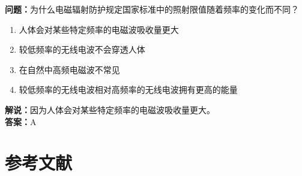 \documentclass[UTF8]{ctexbook}
\begin{document}
\textbf{问题：}为什么电磁辐射防护规定国家标准中的照射限值随着频率的变化而不同？
\begin{enumerate}[label=\Alph*), leftmargin=3em]
  \item 人体会对某些特定频率的电磁波吸收量更大
  \item 较低频率的无线电波不会穿透人体
  \item 在自然中高频电磁波不常见
  \item 较低频率的无线电波相对高频率的无线电波拥有更高的能量
\end{enumerate}
\textbf{解说：}因为人体会对某些特定频率的电磁波吸收量更大。\\
\textbf{答案：}A


\chapter*{参考文献}
\end{document}
